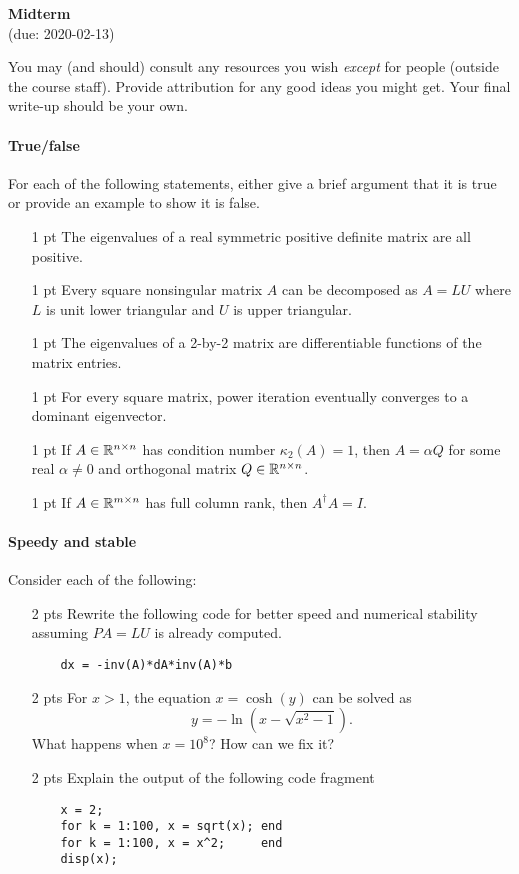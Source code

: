 \documentclass[12pt, leqno]{article} %
\begin{document}
\pagestyle{fancy}
\fancyfoot{}
\begin{center}
  {\large{\bf Midterm}} \\ (due: 2020-02-13)
\end{center}
\lstset{language=Julia,columns=flexible}

You may (and should) consult any resources you wish {\em except} for
people (outside the course staff).  Provide attribution for any good
ideas you might get.  Your final write-up should be your own.


\paragraph*{True/false}
For each of the following statements, either give a brief argument
that it is true or provide an example to show it is false.
\begin{itemize}
\item[1 pt]
  The eigenvalues of a real symmetric positive definite matrix are
  all positive.
\item[1 pt]
  Every square nonsingular matrix $A$ can be decomposed as $A =
  LU$ where $L$ is unit lower triangular and $U$ is upper triangular.
\item[1 pt]
  The eigenvalues of a 2-by-2 matrix are differentiable functions
  of the matrix entries.
\item[1 pt]
  For every square matrix, power iteration eventually converges to
  a dominant eigenvector.
\item[1 pt]
  If $A \in \mathbb{R}^{n \times n}$ has condition number $\kappa_2(A) = 1$,
  then $A = \alpha Q$ for some real $\alpha \neq 0$
  and orthogonal matrix $Q \in \mathbb{R}^{n \times n}$.
\item[1 pt]
  If $A \in \mathbb{R}^{m \times n}$ has full column rank, then $A^\dagger A = I$.
\end{itemize}
  
\paragraph*{Speedy and stable}
Consider each of the following:
\begin{itemize}
\item[2 pts]
  Rewrite the following code for better speed and numerical stability
  assuming $PA = LU$ is already computed.
  \begin{lstlisting}
    dx = -inv(A)*dA*inv(A)*b
  \end{lstlisting}
\item[2 pts]
  For $x > 1$, the equation $x = \cosh(y)$ can be solved as
  \[
    y = -\ln\left(x - \sqrt{x^2-1}\right).
  \]
  What happens when $x = 10^8$?  How can we fix it?
\item[2 pts]
  Explain the output of the following code fragment
  \begin{lstlisting}
    x = 2;
    for k = 1:100, x = sqrt(x); end
    for k = 1:100, x = x^2;     end
    disp(x);
  \end{lstlisting}
\end{itemize}
\end{document}
